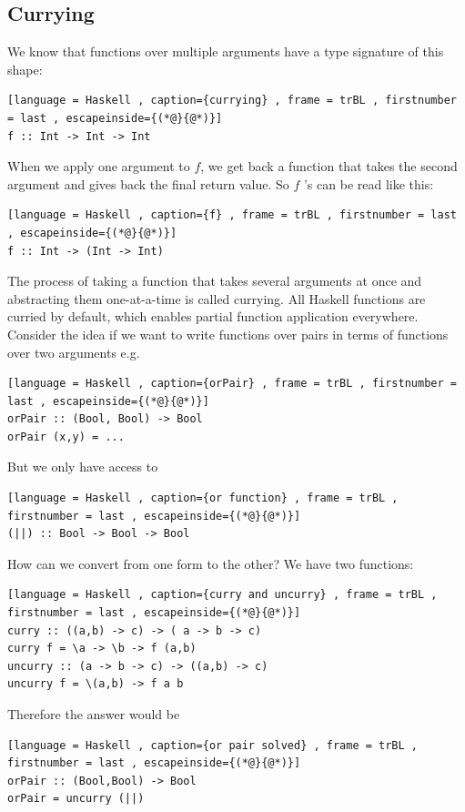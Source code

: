 \documentclass[a4paper]{article}
\theoremstyle{plain}
\theoremstyle{definition}
\theoremstyle{remark}
\begin{document}
\subsection{Currying}
We know that functions over multiple arguments have a type signature of this shape:
\begin{lstlisting}[language = Haskell , caption={currying} , frame = trBL , firstnumber = last , escapeinside={(*@}{@*)}]
f :: Int -> Int -> Int
\end{lstlisting}
When we apply one argument to $f$, we get back a function that takes the second argument and gives back the final return value. So $f$ 's can be read like this:
\begin{lstlisting}[language = Haskell , caption={f} , frame = trBL , firstnumber = last , escapeinside={(*@}{@*)}]
f :: Int -> (Int -> Int)
\end{lstlisting}
The process of taking a function that takes several arguments at once and abstracting them one-at-a-time is called currying. All Haskell functions are curried by default, which enables partial function application everywhere. Consider the idea if we want to write functions over pairs in terms of functions over two arguments e.g.
\begin{lstlisting}[language = Haskell , caption={orPair} , frame = trBL , firstnumber = last , escapeinside={(*@}{@*)}]
orPair :: (Bool, Bool) -> Bool
orPair (x,y) = ...
\end{lstlisting}
But we only have access to
\begin{lstlisting}[language = Haskell , caption={or function} , frame = trBL , firstnumber = last , escapeinside={(*@}{@*)}]
(||) :: Bool -> Bool -> Bool
\end{lstlisting}
How can we convert from one form to the other? 
We have two functions:
\begin{lstlisting}[language = Haskell , caption={curry and uncurry} , frame = trBL , firstnumber = last , escapeinside={(*@}{@*)}]
curry :: ((a,b) -> c) -> ( a -> b -> c)
curry f = \a -> \b -> f (a,b)
uncurry :: (a -> b -> c) -> ((a,b) -> c)
uncurry f = \(a,b) -> f a b
\end{lstlisting}
Therefore the answer would be
\begin{lstlisting}[language = Haskell , caption={or pair solved} , frame = trBL , firstnumber = last , escapeinside={(*@}{@*)}]
orPair :: (Bool,Bool) -> Bool
orPair = uncurry (||)
\end{lstlisting}
\end{document}
